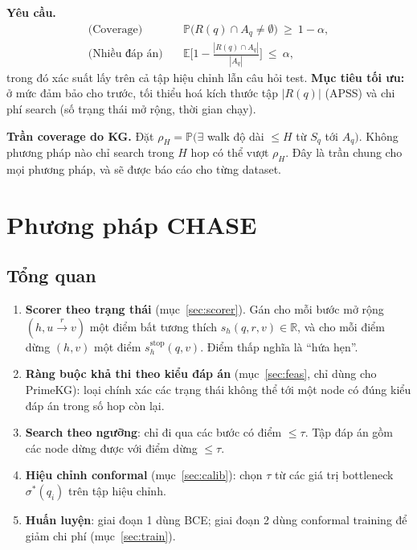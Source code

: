 \documentclass[11pt,a4paper]{article}
\theoremstyle{remark}
\newcommand{\R}{\mathbb{R}}
\newcommand{\Prob}{\mathbb{P}}
\newcommand{\E}{\mathbb{E}}
\newcommand{\Aq}{A_q}
\newcommand{\Sq}{S_q}
\newcommand{\method}{\textsc{CHASE}}
\begin{document}
\noindent\textbf{Yêu cầu.}
\begin{align}
\text{(Coverage)}\quad & \Prob\big(R(q)\cap\Aq\neq\emptyset\big)\ \ge\ 1-\alpha, \label{eq:cov}\\
\text{(Nhiều đáp án)}\quad & \E\Big[1-\tfrac{|R(q)\cap\Aq|}{|\Aq|}\Big]\ \le\ \alpha, \label{eq:fnr}
\end{align}
trong đó xác suất lấy trên cả tập hiệu chỉnh lẫn câu hỏi test. \textbf{Mục tiêu tối ưu:} ở mức đảm bảo cho trước, tối thiểu hoá kích thước tập $|R(q)|$ (APSS) và chi phí search (số trạng thái mở rộng, thời gian chạy).

\noindent\textbf{Trần coverage do KG.} Đặt $\rho_H=\Prob(\exists$ walk độ dài $\le H$ từ $\Sq$ tới $\Aq)$. Không phương pháp nào chỉ search trong $H$ hop có thể vượt $\rho_H$. Đây là trần chung cho mọi phương pháp, và sẽ được báo cáo cho từng dataset.

\section{Phương pháp \method}\label{sec:method}

\subsection{Tổng quan}
\begin{enumerate}[nosep]
  \item \textbf{Scorer theo trạng thái} (mục~\ref{sec:scorer}). Gán cho mỗi bước mở rộng $(h,u\xrightarrow{r}v)$ một điểm bất tương thích $s_h(q,r,v)\in\R$, và cho mỗi điểm dừng $(h,v)$ một điểm $s^{\mathrm{stop}}_h(q,v)$. Điểm thấp nghĩa là ``hứa hẹn''.
  \item \textbf{Ràng buộc khả thi theo kiểu đáp án} (mục~\ref{sec:feas}, chỉ dùng cho PrimeKG): loại chính xác các trạng thái không thể tới một node có đúng kiểu đáp án trong số hop còn lại.
  \item \textbf{Search theo ngưỡng}: chỉ đi qua các bước có điểm $\le\tau$. Tập đáp án gồm các node dừng được với điểm dừng $\le\tau$.
  \item \textbf{Hiệu chỉnh conformal} (mục~\ref{sec:calib}): chọn $\tau$ từ các giá trị bottleneck $\sigma^*(q_i)$ trên tập hiệu chỉnh.
  \item \textbf{Huấn luyện}: giai đoạn 1 dùng BCE; giai đoạn 2 dùng conformal training để giảm chi phí (mục~\ref{sec:train}).
\end{enumerate}
\end{document}

